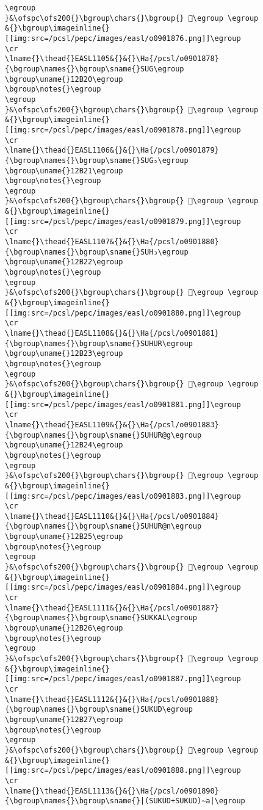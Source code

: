 \begin{verbatim}
\egroup
}&\ofspc\ofs200{}\bgroup\chars{}\bgroup{} 𒬟\egroup \egroup
&{}\bgroup\imageinline{}[[img:src=/pcsl/pepc/images/easl/o0901876.png]]\egroup
\cr
\lname{}\thead{}EASL1105&{}&{}\Ha{/pcsl/o0901878}{\bgroup\names{}\bgroup\sname{}SUG\egroup
\bgroup\uname{}12B20\egroup
\bgroup\notes{}\egroup
\egroup
}&\ofspc\ofs200{}\bgroup\chars{}\bgroup{} 𒬠\egroup \egroup
&{}\bgroup\imageinline{}[[img:src=/pcsl/pepc/images/easl/o0901878.png]]\egroup
\cr
\lname{}\thead{}EASL1106&{}&{}\Ha{/pcsl/o0901879}{\bgroup\names{}\bgroup\sname{}SUG₅\egroup
\bgroup\uname{}12B21\egroup
\bgroup\notes{}\egroup
\egroup
}&\ofspc\ofs200{}\bgroup\chars{}\bgroup{} 𒬡\egroup \egroup
&{}\bgroup\imageinline{}[[img:src=/pcsl/pepc/images/easl/o0901879.png]]\egroup
\cr
\lname{}\thead{}EASL1107&{}&{}\Ha{/pcsl/o0901880}{\bgroup\names{}\bgroup\sname{}SUH₃\egroup
\bgroup\uname{}12B22\egroup
\bgroup\notes{}\egroup
\egroup
}&\ofspc\ofs200{}\bgroup\chars{}\bgroup{} 𒬢\egroup \egroup
&{}\bgroup\imageinline{}[[img:src=/pcsl/pepc/images/easl/o0901880.png]]\egroup
\cr
\lname{}\thead{}EASL1108&{}&{}\Ha{/pcsl/o0901881}{\bgroup\names{}\bgroup\sname{}SUHUR\egroup
\bgroup\uname{}12B23\egroup
\bgroup\notes{}\egroup
\egroup
}&\ofspc\ofs200{}\bgroup\chars{}\bgroup{} 𒬣\egroup \egroup
&{}\bgroup\imageinline{}[[img:src=/pcsl/pepc/images/easl/o0901881.png]]\egroup
\cr
\lname{}\thead{}EASL1109&{}&{}\Ha{/pcsl/o0901883}{\bgroup\names{}\bgroup\sname{}SUHUR@g\egroup
\bgroup\uname{}12B24\egroup
\bgroup\notes{}\egroup
\egroup
}&\ofspc\ofs200{}\bgroup\chars{}\bgroup{} 𒬤\egroup \egroup
&{}\bgroup\imageinline{}[[img:src=/pcsl/pepc/images/easl/o0901883.png]]\egroup
\cr
\lname{}\thead{}EASL1110&{}&{}\Ha{/pcsl/o0901884}{\bgroup\names{}\bgroup\sname{}SUHUR@n\egroup
\bgroup\uname{}12B25\egroup
\bgroup\notes{}\egroup
\egroup
}&\ofspc\ofs200{}\bgroup\chars{}\bgroup{} 𒬥\egroup \egroup
&{}\bgroup\imageinline{}[[img:src=/pcsl/pepc/images/easl/o0901884.png]]\egroup
\cr
\lname{}\thead{}EASL1111&{}&{}\Ha{/pcsl/o0901887}{\bgroup\names{}\bgroup\sname{}SUKKAL\egroup
\bgroup\uname{}12B26\egroup
\bgroup\notes{}\egroup
\egroup
}&\ofspc\ofs200{}\bgroup\chars{}\bgroup{} 𒬦\egroup \egroup
&{}\bgroup\imageinline{}[[img:src=/pcsl/pepc/images/easl/o0901887.png]]\egroup
\cr
\lname{}\thead{}EASL1112&{}&{}\Ha{/pcsl/o0901888}{\bgroup\names{}\bgroup\sname{}SUKUD\egroup
\bgroup\uname{}12B27\egroup
\bgroup\notes{}\egroup
\egroup
}&\ofspc\ofs200{}\bgroup\chars{}\bgroup{} 𒬧\egroup \egroup
&{}\bgroup\imageinline{}[[img:src=/pcsl/pepc/images/easl/o0901888.png]]\egroup
\cr
\lname{}\thead{}EASL1113&{}&{}\Ha{/pcsl/o0901890}{\bgroup\names{}\bgroup\sname{}|(SUKUD+SUKUD)∼a|\egroup

\end{verbatim}
